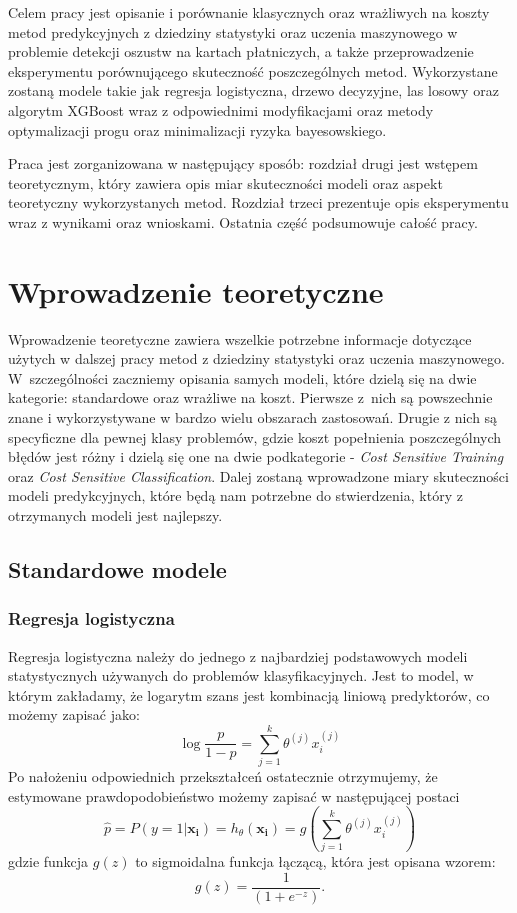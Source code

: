 \documentclass[openany]{book}
\begin{document}
	Celem pracy jest opisanie i porównanie klasycznych oraz wrażliwych na koszty metod predykcyjnych z dziedziny statystyki oraz uczenia maszynowego w problemie detekcji oszustw na kartach płatniczych, a także przeprowadzenie eksperymentu porównującego skuteczność poszczególnych metod. Wykorzystane zostaną modele takie jak regresja logistyczna, drzewo decyzyjne, las losowy oraz algorytm XGBoost wraz z odpowiednimi modyfikacjami oraz metody optymalizacji progu oraz minimalizacji ryzyka bayesowskiego.
	
	Praca jest zorganizowana w następujący sposób: rozdział drugi jest wstępem teoretycznym, który zawiera opis miar skuteczności modeli oraz aspekt teoretyczny wykorzystanych metod. Rozdział trzeci prezentuje opis eksperymentu wraz z wynikami oraz wnioskami. Ostatnia część podsumowuje całość pracy.

\chapter{Wprowadzenie teoretyczne}

	Wprowadzenie teoretyczne zawiera wszelkie potrzebne informacje dotyczące użytych w dalszej pracy metod z dziedziny statystyki oraz uczenia maszynowego. W~szczególności zaczniemy opisania samych modeli, które dzielą się na dwie kategorie: standardowe oraz wrażliwe na koszt. Pierwsze z~nich są powszechnie znane i wykorzystywane w bardzo wielu obszarach zastosowań. Drugie z nich są specyficzne dla pewnej klasy problemów, gdzie koszt popełnienia poszczególnych błędów jest różny i dzielą się one na dwie podkategorie - \textit{Cost Sensitive Training} oraz \textit{Cost Sensitive Classification}. Dalej zostaną wprowadzone miary skuteczności modeli predykcyjnych, które będą nam potrzebne do stwierdzenia, który z otrzymanych modeli jest najlepszy.
	

\section{Standardowe modele}

	

\subsection{Regresja logistyczna}
\label{reg-log}
	Regresja logistyczna należy do jednego z najbardziej podstawowych modeli statystycznych używanych do problemów klasyfikacyjnych. Jest to model, w którym zakładamy, że logarytm szans jest kombinacją liniową predyktorów, co możemy zapisać jako:
	$$ \log{\frac{p}{1 - p}} = \sum_{j=1}^k \theta^{(j)}x_i^{(j)} $$
	Po nałożeniu odpowiednich przekształceń ostatecznie otrzymujemy, że estymowane prawdopodobieństwo możemy zapisać w następującej postaci
	\begin{equation}
		\hat{p} = P(y=1|\boldsymbol{x_i}) = h_{\theta}(\boldsymbol{x_i}) = g\left(\sum_{j=1}^k \theta^{(j)}x_i^{(j)} \right)
	\end{equation} 
	gdzie funkcja $g(z)$ to sigmoidalna funkcja łączącą, która jest opisana wzorem: 
	$$ g(z) = \frac{1}{(1+e^{-z})} \text{.}$$
	
\end{document}

